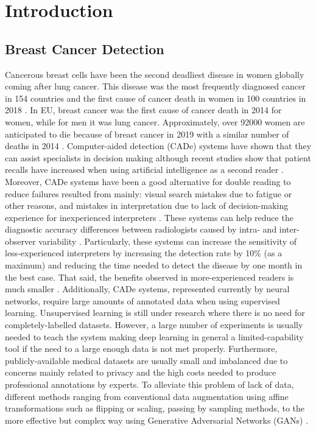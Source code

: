 \documentclass[final,3p,twocolumn,authoryear,sort&compress,times]{maia}
\begin{document}
\section{Introduction}
\label{sec:introduction}
    \subsection{Breast Cancer Detection}
Cancerous breast cells have been the second deadliest disease in women globally coming after lung cancer. This disease was the most frequently diagnosed cancer in 154 countries and the first cause of cancer death in women in 100 countries in 2018 \citep{cancer_stats}. In EU, breast cancer was the first cause of cancer death in 2014 for women, while for men it was lung cancer. Approximately, over 92000 women are anticipated to die because of breast cancer in 2019 with a similar number of deaths in 2014 \citep{EU_stats}. Computer-aided detection (CADe) systems have shown that they can assist specialists in decision making although recent studies show that patient recalls have increased when using artificial intelligence as a second reader \citep{ai_breastImaging}. Moreover, CADe systems have been a good alternative for double reading to reduce failures resulted from mainly: visual search mistakes due to fatigue or other reasons, and mistakes in interpretation due to lack of decision-making experience for inexperienced interpreters \citep{Bazzocchi2007}. These systems can help reduce the diagnostic accuracy differences between radiologists caused by intra- and inter-observer variability \citep{radiologists_variability}. Particularly, these systems can increase the sensitivity of less-experienced interpreters by increasing the detection rate by 10\% (as a maximum) and reducing the time needed to detect the disease by one month in the best case. That said, the benefits observed in more-experienced readers is much smaller \citep{CAD_failed}. Additionally, CADe systems, represented currently by neural networks, require large amounts of annotated data when using supervised learning. Unsupervised learning is still under research where there is no need for completely-labelled datasets. However, a large number of experiments is usually needed to teach the system making deep learning in general a limited-capability tool if the need to a large enough data is not met properly. Furthermore, publicly-available medical datasets are usually small and imbalanced due to concerns mainly related to privacy and  the high costs needed to produce professional annotations by experts. To alleviate this problem of lack of data, different methods ranging from conventional data augmentation using affine transformations such as flipping or scaling, passing by sampling methods, to the more effective but complex way using Generative Adversarial Networks (GANs) \citep{GAN}.
\end{document}
